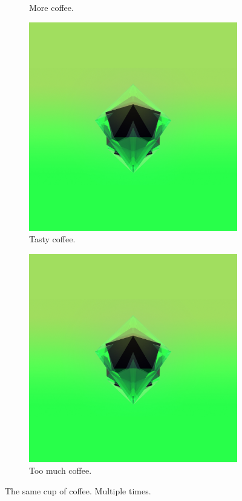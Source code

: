 \documentclass{article}
\begin{document}
\begin{figure}[t!]
\begin{subfigure}[b]{0.3\linewidth}
    \caption{More coffee.}
  \end{subfigure}
  \begin{subfigure}[b]{0.3\linewidth}
    \includegraphics[width=\linewidth]{test.jpg}
    \caption{Tasty coffee.}
  \end{subfigure}
  \begin{subfigure}[b]{0.5\linewidth}
    \includegraphics[width=\linewidth]{test.jpg}
    \caption{Too much coffee.}
  \end{subfigure}
  \caption{The same cup of coffee. Multiple times.}
  \label{fig:coffee3}
\end{figure}
\end{document}
